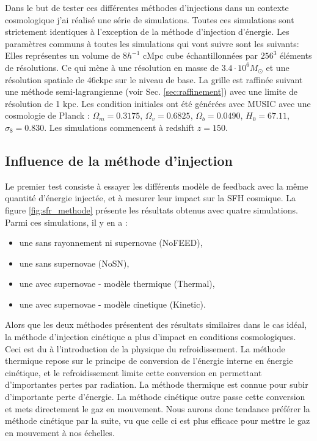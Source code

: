 Dans le but de tester ces différentes méthodes d'injections dans un contexte cosmologique j'ai réalisé une série de simulations.
\label{sec:pres_simu}
Toutes ces simulations sont strictement identiques à l'exception de la méthode d'injection d'énergie.
Les paramètres communs à toutes les simulations qui vont suivre sont les suivants:
Elles représentes un volume de $8h^{-1}$ cMpc cube échantillonnées par $256^3$ éléments de résolutions. %
Ce qui mène à une résolution en masse de $3.4 \cdot 10^6 M_\odot$ et une résolution spatiale de $46$ckpc sur le niveau de base.
La grille est raffinée suivant une méthode semi-lagrangienne (voir Sec. \ref{sec:raffinement}) avec une limite de résolution de 1 kpc.
Les condition initiales ont été générées avec MUSIC \citep{hahn_multi-scale_2011} avec une cosmologie de Planck \citep{planck_collaboration_planck_2016} : 
$\Omega_m=0.3175$, 
$\Omega_v=0.6825$,
$\Omega_b=0.0490$,
$H_0=67.11$,
$\sigma_8=0.830$. 
Les simulations commencent à redshift $z=150$.

\subsection{Influence de la méthode d'injection}
\label{sec:snmethod}

Le premier test consiste à essayer les différents modèle de feedback avec la même quantité d'énergie injectée, et à mesurer leur impact sur la \ac{SFH} cosmique.
La figure \ref{fig:sfr_methode} présente les résultats obtenus avec quatre simulations.
Parmi ces simulations, il y en a :
\begin{itemize}
\item une sans rayonnement ni supernovae (NoFEED),
\item une sans supernovae (NoSN),
\item une avec supernovae - modèle thermique (Thermal),
\item une avec supernovae - modèle cinetique (Kinetic).
\end{itemize}

Alors que les deux méthodes présentent des résultats similaires dans le cas idéal, la méthode d'injection cinétique a plus d'impact en conditions cosmologiques.
Ceci est du à l'introduction de la physique du refroidissement.
La méthode thermique repose sur le principe de conversion de l'énergie interne en énergie cinétique, et le refroidissement limite cette conversion en permettant d'importantes pertes par radiation.
La méthode thermique est connue %
pour subir d'importante perte d'énergie.
La méthode cinétique outre passe cette conversion et mets directement le gaz en mouvement.
Nous aurons donc tendance préférer la méthode cinétique par la suite, vu que celle ci est plus efficace pour mettre le gaz en mouvement à nos échelles.

